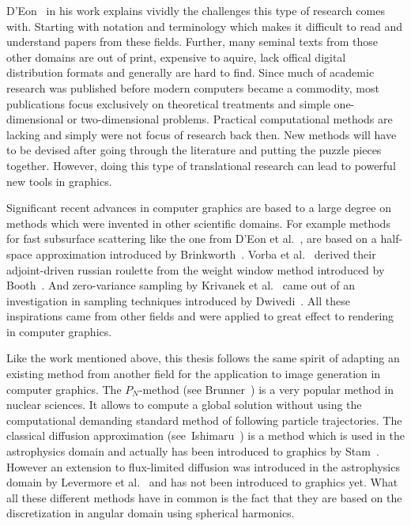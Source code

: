 D'Eon~\cite{DEon14} in his work explains vividly the challenges this type of research comes with. Starting with notation and terminology which makes it difficult to read and understand papers from these fields. Further, many seminal texts from those other domains are out of print, expensive to aquire, lack offical digital distribution formats and generally are hard to find. Since much of academic research was published before modern computers became a commodity, most publications focus exclusively on theoretical treatments and simple one-dimensional or two-dimensional problems. Practical computational methods are lacking and simply were not focus of research back then. New methods will have to be devised after going through the literature and putting the puzzle pieces together. However, doing this type of translational research can lead to powerful new tools in graphics.

Significant recent advances in computer graphics are based to a large degree on methods which were invented in other scientific domains. For example methods for fast subsurface scattering like the one from D'Eon et al.~\cite{dEon11}, are based on a half-space approximation introduced by Brinkworth~\cite{Brinkworth64}. Vorba et al.~\cite{Vorba16} derived their adjoint-driven russian roulette from the weight window method introduced by Booth~\cite{Booth85}. And zero-variance sampling by Krivanek et al.~\cite{Krivanek14} came out of an investigation in sampling techniques introduced by Dwivedi~\cite{Dwivedi82}. All these inspirations came from other fields and were applied to great effect to rendering in computer graphics.

Like the work mentioned above, this thesis follows the same spirit of adapting an existing method from another field for the application to image generation in computer graphics. The $P_N$-method (see Brunner~\cite{Brunner02}) is a very popular method in nuclear sciences. It allows to compute a global solution without using the computational demanding standard method of following particle trajectories. The classical diffusion approximation (see~Ishimaru~\cite{Ishimaru78}) is a method which is used in the astrophysics domain and actually has been introduced to graphics by Stam~\cite{Stam95}. However an extension to flux-limited diffusion was introduced in the astrophysics domain by Levermore et al.~\cite{Levermore81} and has not been introduced to graphics yet. What all these different methods have in common is the fact that they are based on the discretization in angular domain using spherical harmonics.

